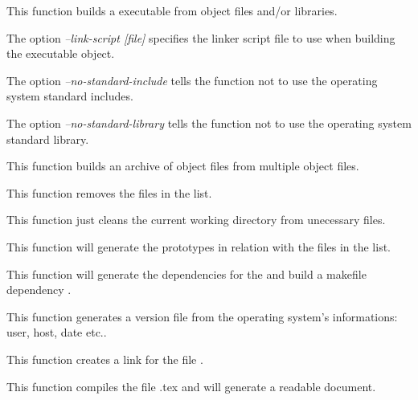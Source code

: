          {
	   This function builds a executable from object files and/or
	   libraries.

	   The option \textit{--link-script [file]} specifies the
	   linker script file to use when building the executable object.

	   The option \textit{--no-standard-include} tells the function
	   not to use the operating system standard includes.

	   The option \textit{--no-standard-library} tells the function
	   not to use the operating system standard library.
	 }

         {
	   This function builds an archive of object files from multiple
	   object files.
	 }

         {
	   This function removes the files in the list.
	 }

         {
	   This function just cleans the current working directory from
	   unecessary files.
	 }

         {
	   This function will generate the prototypes in relation with
	   the files in the list.
	 }

         {
	   This function will generate the dependencies for the
	    and build a makefile dependency
	   .
	 }

         {
	   This function generates a version file from the operating
	   system's informations: user, host, date etc..
	 }

         {
	   This function creates a link  for the file
	   .
	 }

         {
	   This function compiles the file .tex and
	   will generate a readable document.
	 }

